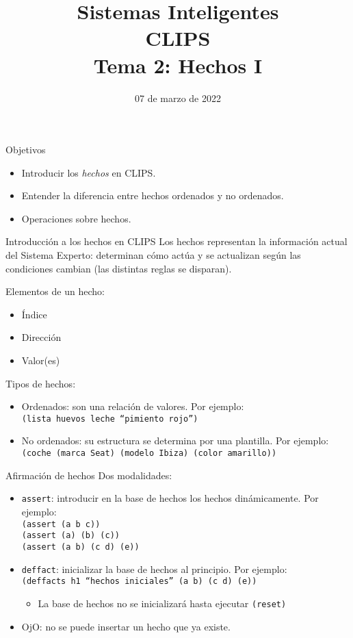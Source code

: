 \documentclass[usenames,dvipsnames,aspectratio=169]{beamer}
\title[N-Reinas]{{\LARGE Sistemas Inteligentes\\CLIPS}\\[0.5cm]Tema 2: Hechos I}
\date[Marzo, 2022]{07 de marzo de 2022}
\author[A. Esteban]{\texorpdfstring{
    \begin{minipage}{0.47\linewidth}
        Aurora Esteban Toscano
        \pdfnewline
        \texttt{aestebant@uco.es}
    \end{minipage}
}{Aurora Esteban Toscano}
}
\institute{Grado en Ingeniería Informática, Universidad de Córdoba}
\begin{document}

\begin{frame}
\titlepage
\end{frame}

\begin{frame}{Objetivos}
	\begin{itemize}
		\item Introducir los \textit{hechos} en CLIPS.
		\item Entender la diferencia entre hechos ordenados y no ordenados.
		\item Operaciones sobre hechos.
	\end{itemize}
\end{frame}

\begin{frame}{Introducción a los hechos en CLIPS}
	Los hechos representan la información actual del Sistema Experto: determinan cómo actúa y se actualizan según las condiciones cambian (las distintas reglas se disparan).
	
	Elementos de un hecho:
	\begin{itemize}
		\item Índice
		\item Dirección
		\item Valor(es)
	\end{itemize}

	Tipos de hechos:
	\begin{itemize}
		\item Ordenados: son una relación de valores. Por ejemplo:\\
		\texttt{(lista huevos leche ``pimiento rojo'')}
		\item No ordenados: su estructura se determina por una plantilla. Por ejemplo:\\
		\texttt{(coche (marca Seat) (modelo Ibiza) (color amarillo))}
	\end{itemize}
\end{frame}

\begin{frame}{Afirmación de hechos}
	Dos modalidades:
	\begin{itemize}
		\item \texttt{assert}: introducir en la base de hechos los hechos dinámicamente. Por ejemplo:\\
		\texttt{(assert (a b c))}\\
		\texttt{(assert (a) (b) (c))}\\
		\texttt{(assert (a b) (c d) (e))}
		\item \texttt{deffact}: inicializar la base de hechos al principio. Por ejemplo:\\
		\texttt{(deffacts h1 ``hechos iniciales'' (a b) (c d) (e))}
		\begin{itemize}
			\item La base de hechos no se inicializará hasta ejecutar \texttt{(reset)}
		\end{itemize}
		\item OjO: no se puede insertar un hecho que ya existe.
	\end{itemize}
\end{frame}
\end{document}
